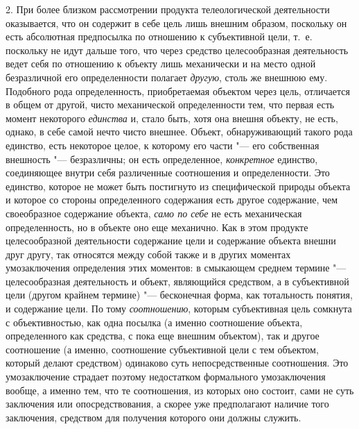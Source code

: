 {{2. При более близком рассмотрении продукта телеологической
деятельности оказывается, что он содержит в себе цель лишь внешним образом,
поскольку он есть абсолютная предпосылка по отношению к субъективной цели,
т.~е. поскольку не идут дальше того, что через средство целесообразная
деятельность ведет себя по отношению к объекту лишь механически и на место
одной безразличной его определенности полагает {\em другую}, столь же
внешнюю ему. Подобного рода определенность, приобретаемая объектом через
цель, отличается в общем от другой, чисто механической
определенности тем, что первая есть момент некоторого
{\em единства} и, стало
быть, хотя она внешня объекту, не есть, однако, в себе самой нечто чисто
внешнее. Объект, обнаруживающий такого рода единство, есть некоторое целое,
к которому его части "--- его собственная внешность
"--- безразличны; он есть определенное,
{\em конкретное}
единство, соединяющее внутри себя различенные соотношения и
определенности. Это единство, которое не может быть постигнуто из
специфической природы объекта и которое со стороны определенного содержания
есть другое содержание, чем своеобразное содержание объекта,
{\em само по себе} не
есть механическая определенность, но в объекте оно еще механично. Как в
этом продукте целесообразной деятельности содержание цели и содержание
объекта внешни друг другу, так относятся между собой также и в других
моментах умозаключения определения этих моментов: в смыкающем среднем
термине "--- целесообразная деятельность и объект, являющийся
средством, а в субъективной цели (другом крайнем термине)
"--- бесконечная форма, как тотальность понятия, и содержание
цели. По тому {\em соотношению},
которым субъективная цель сомкнута с объективностью, как одна
посылка (а именно соотношение объекта, определенного как средства, с пока
еще внешним объектом), так и другое соотношение (а именно, соотношение
субъективной цели с тем объектом, который делают средством) одинаково суть
непосредственные соотношения. Это умозаключение страдает поэтому
недостатком формального умозаключения вообще, а именно тем, что те
соотношения, из которых оно состоит, сами не суть заключения или
опосредствования, а скорее уже предполагают наличие того заключения,
средством для получения которого они должны служить.

}}
